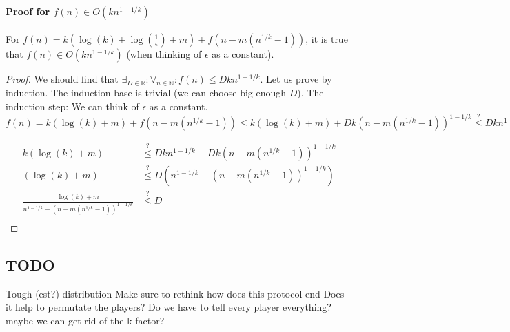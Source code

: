 \documentclass{article}
\begin{document}
\paragraph{Proof for $f(n) \in O(kn^{1-1/k})$}
\begin{claim} 
For $f(n) = k(\log(k) + \log(\frac{1}{\epsilon}) + m) + f(n - m(n^{1/k} - 1))$, it is true that $f(n) \in O(kn^{1-1/k})$ (when thinking of $\epsilon$ as a constant). \newline
\end{claim}
\begin{proof}
We should find that $ \exists_{D\in\mathbb{R}} : \forall_{n \in \mathbb{N}} : f(n) \leq Dkn^{1-1/k}$. Let us prove by induction. The induction base is trivial (we can choose big enough $D$). The induction step: \newline
We can think of $\epsilon$ as a constant. \newline
$f(n) = k(\log(k) + m) + f(n - m(n^{1/k} - 1)) \leq k(\log(k) + m) + Dk(n - m(n^{1/k} - 1))^{1-1/k} \overset{?}{\leq} Dkn^{1-1/k}$ \newline

\begin{align*}
  k(\log(k) + m) &\overset{?}{\leq} Dkn^{1-1/k} -  Dk(n - m(n^{1/k} - 1))^{1-1/k}\\
  (\log(k) + m) &\overset{?}{\leq} D(n^{1-1/k} -  (n - m(n^{1/k} - 1))^{1-1/k})\\
  \frac{\log(k) + m}{n^{1-1/k} -  (n - m(n^{1/k} - 1))^{1-1/k}} & \overset{?}{\leq} D \\
\end{align*}

\end{proof}

\subsection{TODO}
Tough (est?) distribution\newline
Make sure to rethink how does this protocol end \newline
Does it help to permutate the players? \newline
Do we have to tell every player everything? maybe we can get rid of the k factor? \newline
\end{document}
